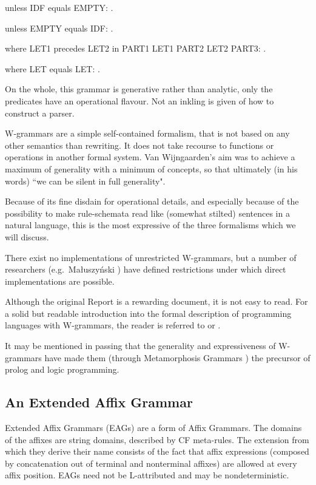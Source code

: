 \begin{elan}
unless IDF equals EMPTY: .
\end{elan}
\begin{elan}
unless EMPTY equals IDF: .
\end{elan}
\begin{elan}
where LET1 precedes LET2 in PART1 LET1 PART2 LET2 PART3: .
\end{elan}
\begin{elan}
where LET equals LET: .
\end{elan}
On the whole, this grammar is generative rather than analytic,
only the predicates have an operational flavour.
Not an inkling is given of how to construct a parser.

W-grammars are a simple self-contained formalism, that is not based
on any other semantics than rewriting. It does not take recourse
to functions or operations in another formal system.
Van Wijngaarden's aim was to achieve a maximum of generality with
a minimum of concepts, so that ultimately (in his words)
``we can be silent in full generality".

Because of its fine disdain for operational details, and especially
because of the possibility to make rule-schemata read like (somewhat stilted)
sentences in a natural language, this is the most expressive of the
three formalisms which we will discuss.

There exist no implementations of unrestricted W-grammars, but a number
of researchers (e.g.\ Ma{\l}uszy\'nski \cite{maluszynski:p2lg})
have defined restrictions under which direct implementations are
possible.

Although the original Report \cite{wijngaarden:algol68} is a rewarding
document, it is not easy to read. For a solid but readable introduction
into the formal
description of programming languages with W-grammars, the reader
is referred to \cite{cleaveland:grpl} or \cite{pagan:primer}.

It may be mentioned in passing that the generality and
expressiveness of W-grammars have made them
(through Metamorphosis Grammars \cite{colmerauer:metamorph})
the precursor of {\sc prolog} and logic programming.

\subsection{An Extended Affix Grammar}
Extended Affix Grammars (EAGs) are a form of Affix Grammars.
The domains of the affixes are string domains, described
by CF meta-rules.
The extension from which they derive their name consists of the fact
that affix expressions (composed by concatenation out of terminal and
nonterminal affixes) are allowed at every affix position.
EAGs need not be L-attributed and may be nondeterministic.

